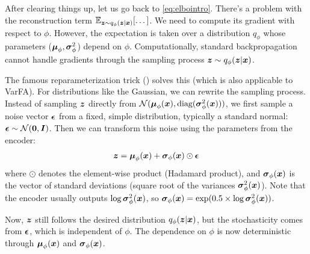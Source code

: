 After clearing things up, let us go back to \eqref{eq:elbointro}. There's a
problem with the reconstruction term $\mathbb{E}_{\boldsymbol{z} \sim q_{\phi}(\boldsymbol{z}|\boldsymbol{x})} [\dots]$.
We need to compute its gradient with respect to $\phi$. However, the
expectation is taken over a distribution $q_{\phi}$ whose parameters
($\boldsymbol{\mu}_{\phi}, \boldsymbol{\sigma}^2_{\phi}$) depend on $\phi$. Computationally, standard
backpropagation cannot handle gradients through the sampling process $\boldsymbol{z} \sim
    q_{\phi}(\boldsymbol{z}|\boldsymbol{x})$.

The famous reparameterization trick (\cite{kingma2013auto}) solves this (which
is also applicable to VarFA). For distributions like the Gaussian, we can
rewrite the sampling process. Instead of sampling $\boldsymbol{z}$ directly from
$\mathcal{N}(\boldsymbol{\mu}_{\phi}(\boldsymbol{x}), \text{diag}(\boldsymbol{\sigma}^2_{\phi}(\boldsymbol{x})))$, we first sample
a noise vector $\boldsymbol{\epsilon}$ from a fixed, simple distribution, typically a
standard normal: $\boldsymbol{\epsilon} \sim \mathcal{N}(\mathbf{0}, \boldsymbol{I})$. Then we can
transform this noise using the parameters from the encoder:
\begin{align}
    \boldsymbol{z} = \boldsymbol{\mu}_{\phi}(\boldsymbol{x}) + \boldsymbol{\sigma}_{\phi}(\boldsymbol{x}) \odot \boldsymbol{\epsilon}
    \label{eq:reparam}
\end{align}
where $\odot$ denotes the element-wise product (Hadamard product), and $\boldsymbol{\sigma}_{\phi}(\boldsymbol{x})$ is the vector of standard deviations (square root of the variances $\boldsymbol{\sigma}^2_{\phi}(\boldsymbol{x})$). Note that the encoder usually outputs $\log \boldsymbol{\sigma}^2_{\phi}(\boldsymbol{x})$, so $\boldsymbol{\sigma}_{\phi}(\boldsymbol{x}) = \exp(0.5 \times \log \boldsymbol{\sigma}^2_{\phi}(\boldsymbol{x}))$.

Now, $\boldsymbol{z}$ still follows the desired distribution $q_{\phi}(\boldsymbol{z}|\boldsymbol{x})$, but the
stochasticity comes from $\boldsymbol{\epsilon}$, which is independent of $\phi$. The
dependence on $\phi$ is now deterministic through $\boldsymbol{\mu}_{\phi}(\boldsymbol{x})$ and
$\boldsymbol{\sigma}_{\phi}(\boldsymbol{x})$.


